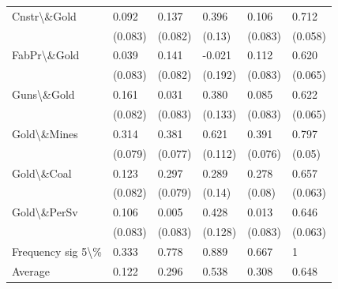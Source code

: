 \begin{tabular}{l|l|l|l|l|l}
Cnstr\textbackslash{}\&Gold & 0.092 & 0.137 & 0.396 & 0.106 & 0.712\\
 & (0.083) & (0.082) & (0.13) & (0.083) & (0.058)\\
FabPr\textbackslash{}\&Gold & 0.039 & 0.141 & -0.021 & 0.112 & 0.620\\
 & (0.083) & (0.082) & (0.192) & (0.083) & (0.065)\\
Guns\textbackslash{}\&Gold & 0.161 & 0.031 & 0.380 & 0.085 & 0.622\\
 & (0.082) & (0.083) & (0.133) & (0.083) & (0.065)\\
Gold\textbackslash{}\&Mines & 0.314 & 0.381 & 0.621 & 0.391 & 0.797\\
 & (0.079) & (0.077) & (0.112) & (0.076) & (0.05)\\
Gold\textbackslash{}\&Coal & 0.123 & 0.297 & 0.289 & 0.278 & 0.657\\
 & (0.082) & (0.079) & (0.14) & (0.08) & (0.063)\\
Gold\textbackslash{}\&PerSv & 0.106 & 0.005 & 0.428 & 0.013 & 0.646\\
 & (0.083) & (0.083) & (0.128) & (0.083) & (0.063)\\
Frequency sig 5\textbackslash{}\% & 0.333 & 0.778 & 0.889 & 0.667 & 1\\
Average & 0.122 & 0.296 & 0.538 & 0.308 & 0.648\\
\hline
\end{tabular}
